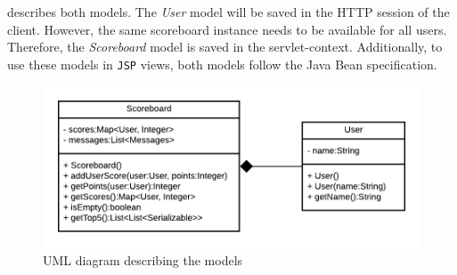  describes both models. The \textit{User} model will be saved in the HTTP session of the client. However, the same scoreboard instance needs to be available for all users. Therefore, the \textit{Scoreboard} model is saved in the servlet-context.
Additionally, to use these models in \texttt{JSP} views, both models follow the Java Bean specification.
\begin{figure}[h]
\centering
\includegraphics[scale=0.8]{images/03_impl/models}
\caption{UML diagram describing the models}
\label{fig:subsubsec:03_impl_backend_models_uml}
\end{figure}

\newpage
